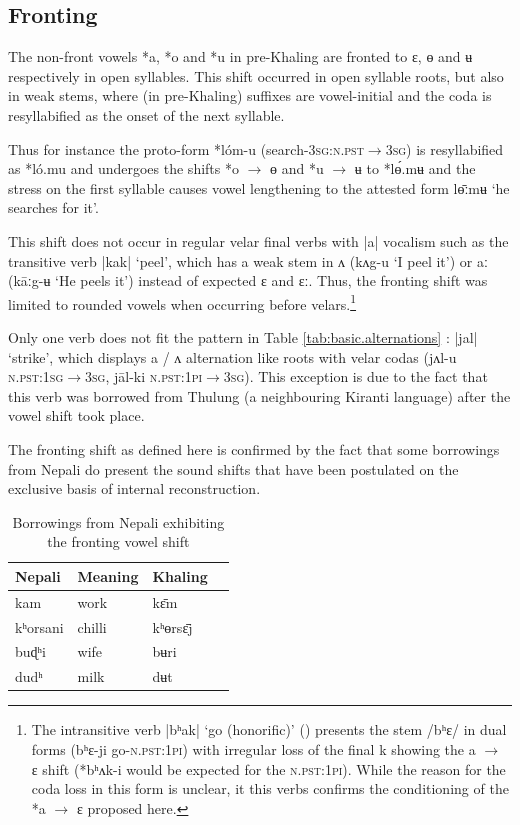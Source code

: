 \documentclass[oldfontcommands,oneside,a4paper,11pt]{article}
\newcommand{\ipa}[1]{{\phon \mbox{#1}}} %
\begin{document}
\subsection{Fronting} \label{sec:fronting}
The non-front vowels \ipa{*a}, \ipa{*o} and \ipa{*u} in pre-Khaling are fronted to \ipa{ɛ}, \ipa{ɵ} and \ipa{ʉ} respectively in open syllables. This shift occurred in   open syllable roots, but also in weak stems, where (in pre-Khaling) suffixes are vowel-initial and the coda is resyllabified as the onset of the next syllable. 

Thus for instance  the proto-form \ipa{*lóm-u} (search-\textsc{3sg:n.pst$\rightarrow$3sg}) is resyllabified as \ipa{*ló.mu} and undergoes the shifts \ipa{*o} $\rightarrow$ \ipa{ɵ} and \ipa{*u} $\rightarrow$ \ipa{ʉ} to  \ipa{*lɵ́.mʉ} and the stress on the first syllable causes vowel lengthening to the attested form \ipa{lɵ̄ːmʉ} `he searches for it'.

This shift does not occur in regular velar final verbs with |a| vocalism such as the transitive verb |\ipa{kak}| `peel', which has a weak stem in \ipa{ʌ} (\ipa{kʌg-u} `I peel it') or \ipa{aː}  (\ipa{kāːg-ʉ} `He peels it') instead of expected \ipa{ɛ} and \ipa{ɛː}.  Thus, the fronting shift was limited to rounded vowels when occurring before velars.\footnote{The intransitive   verb |\ipa{bʰak}| `go (honorific)' (\citealt[1115]{jacques12khaling}) presents the stem  /\ipa{bʰɛ}/ in dual forms (\ipa{bʰɛ-ji} go-\textsc{n.pst:1pi}) with irregular loss of  the final \ipa{k} showing the \ipa{a} $\rightarrow$ \ipa{ɛ} shift (\ipa{*bʰʌk-i} would be expected for the \textsc{n.pst:1pi}). While the reason for the coda loss in this form is unclear, it this verbs confirms the conditioning of the \ipa{*a} $\rightarrow$ \ipa{ɛ} proposed here.}

 Only one verb  does not fit the pattern in Table \ref{tab:basic.alternations} :  |\ipa{jal}|  `strike', which displays \ipa{a} / \ipa{ʌ} alternation like roots with velar codas (\ipa{jʌl-u} \textsc{n.pst:1sg$\rightarrow$3sg}, \ipa{ja‍̄l-ki} \textsc{n.pst:1pi$\rightarrow$3sg}). This exception is due to the fact that this verb was borrowed from Thulung (a neighbouring Kiranti language) after the vowel shift took place.

The fronting shift as defined here is confirmed   by the fact that some borrowings from Nepali do present the sound shifts that have been postulated on the exclusive basis of internal reconstruction.

\begin{table}
\caption{Borrowings from Nepali exhibiting the fronting vowel shift} \label{tab:nep.fronting} \centering
\begin{tabular}{llll}
\toprule
Nepali & Meaning & Khaling \\
\midrule
\ipa{kam} & work & \ipa{kɛ̄m} \\
\ipa{kʰorsani} & chilli&\ipa{kʰɵrsɛ̄j}\\
\ipa{buɖʰi} & wife&\ipa{bʉri}\\
\ipa{dudʰ} & milk&\ipa{dʉt}\\
\bottomrule
\end{tabular}
\end{table}
\end{document}
